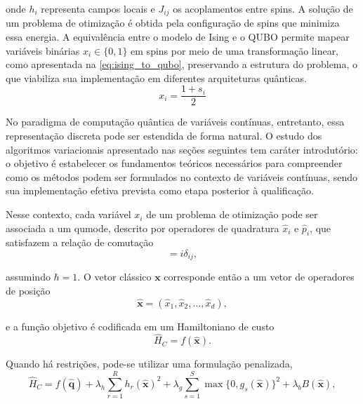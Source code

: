 \noindent onde $h_i$ representa campos locais e $J_{ij}$ os acoplamentos entre spins. A solução de um problema de otimização é obtida pela configuração de spins que minimiza essa energia. A equivalência entre o modelo de Ising e o QUBO permite mapear variáveis binárias $x_i \in \{0,1\}$ em spins por meio de uma transformação linear, como apresentada na \autoref{eq:ising_to_qubo}, preservando a estrutura do problema, o que viabiliza sua implementação em diferentes arquiteturas quânticas.
\begin{equation}
    \label{eq:ising_to_qubo}
    x_i=\frac{1+s_i}{2}
\end{equation}

No paradigma de computação quântica de variáveis contínuas, entretanto, essa representação discreta pode ser estendida de forma natural. O estudo dos algoritmos variacionais apresentado nas seções seguintes tem caráter introdutório: o objetivo é estabelecer os fundamentos teóricos necessários para compreender como os métodos podem ser formulados no contexto de variáveis contínuas, sendo sua implementação efetiva prevista como etapa posterior à qualificação.

Nesse contexto, cada variável $x_i$ de um problema de otimização pode ser associada a um qumode, descrito por operadores de quadratura $\hat{x}_i$ e $\hat{p}_i$, que satisfazem a relação de comutação
\begin{equation}
    [\hat{x}_i,\hat{p}_j] = i\delta_{ij},
\end{equation}

\noindent assumindo $\hbar = 1$. O vetor clássico $\mathbf{x}$ corresponde então a um vetor de operadores de posição
\begin{equation}
    \hat{\mathbf{x}} = (\hat{x}_1,\hat{x}_2,\ldots,\hat{x}_d),
    \label{eq:position_operator}
\end{equation}

\noindent e a função objetivo é codificada em um Hamiltoniano de custo
\begin{equation}
    \hat{H}_C = f(\hat{\mathbf{x}}).
    \label{eq:cv_cost_hamiltonian_basic}
\end{equation}

Quando há restrições, pode-se utilizar uma formulação penalizada,
\begin{equation}
    \hat{H}_C =
    f(\hat{\mathbf{q}})
    + \lambda_h \sum_{r=1}^{R} h_r(\hat{\mathbf{x}})^2
    + \lambda_g \sum_{s=1}^{S} \max\{0,g_s(\hat{\mathbf{x}})\}^{2}
    + \lambda_b B(\hat{\mathbf{x}}),
    \label{eq:cv_cost_hamiltonian_penalized}
\end{equation}


